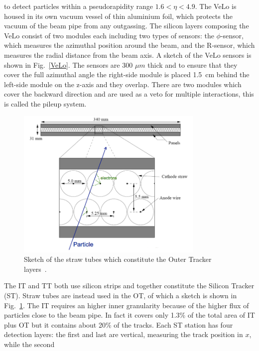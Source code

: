 to detect particles within a pseudorapidity range $1.6 < \eta < 4.9$. The VeLo is housed in its own
vacuum vessel of thin aluminium foil, which protects the vacuum of the beam pipe from any outgassing. 
The silicon layers composing the VeLo consist of two modules each including two types of sensors:
the $\phi$-sensor, which measures the azimuthal position around the beam, and the R-sensor, which measures
the radial distance from the beam axis. A sketch of the VeLo sensors is shown in Fig.~\ref{VeLo}. The sensors
are 300 $\mu m$ thick and to ensure that they cover the full azimuthal angle the right-side module is placed
1.5~cm behind the left-side module on the z-axis and they overlap. There are two modules which cover the
backward direction and are used as a veto for multiple interactions, this is called the pileup system.
%
\begin{center}
\begin{figure}[h!]
\centering 
\includegraphics[width=0.8\textwidth]{Detector/figs/straw_tubes.png}
\caption{Sketch of the straw tubes which constitute the Outer Tracker layers~\cite{Alves:2008zz}.}
\label{fig:straw:tubes}
\end{figure}
\end{center}
%
The IT and TT both use silicon strips and together constitute the Silicon Tracker (ST). Straw tubes are instead used 
in the OT, of which a sketch is shown in Fig.~\ref{fig:straw:tubes}. The IT requires an higher inner granularity
because of the higher flux of particles close to the beam pipe. In fact it covers only 1.3\% of the total
area of IT plus OT but it contains about 20\% of the tracks. Each ST station has four detection layers:
the first and last are vertical, measuring the track position in $x$, while the second 
